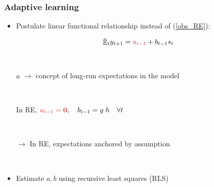 \documentclass[10pt]{beamer}
\DeclareMathOperator{\E}{\mathbb{E}}
\begin{document}
\begin{frame}
	\frametitle{Adaptive learning}
	\label{adaptive_learning}

\begin{itemize}
\item Postulate linear functional relationship instead of (\ref{obs_RE}):

\begin{equation}
\hat{\E}_t y_{t+1} = \textcolor{brownreddark}{a_{t-1}} + b_{t-1}s_t  \label{PLM_fcst_general}
\end{equation}


\

\pause
  


\item[] \textcolor{brownreddark}{$a$}	$\rightarrow$ concept of long-run expectations in the model

\

\pause

In RE, $\textcolor{brownreddark}{a_{t-1} = \mathbf{0}}, \quad b_{t-1} = g\;h \quad \forall t$


\

\pause


\item[$\rightarrow$] In RE, expectations anchored by assumption

\

\pause


\item Estimate $a, b$ using recursive least squares (RLS)


\end{itemize}


\end{frame}
\end{document}
